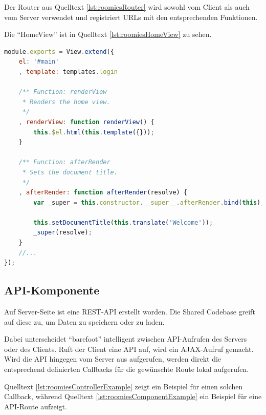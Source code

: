 Der Router aus Quelltext \ref{lst:roomiesRouter} wird sowohl vom Client als auch vom Server verwendet und registriert URLs mit den entsprechenden Funktionen.

Die ``HomeView'' ist in Quelltext \ref{lst:roomiesHomeView} zu sehen.

\begin{lstlisting}[language=JavaScript, caption=Ausschnitt aus HomeView der Beispielapplikation \cite{roomiesHomeView}, label=lst:roomiesHomeView, firstnumber=7]
module.exports = View.extend({
	el: '#main'
	, template: templates.login

	/** Function: renderView
	 * Renders the home view.
	 */
	, renderView: function renderView() {
		this.$el.html(this.template({}));
	}

	/** Function: afterRender
	 * Sets the document title.
	 */
	, afterRender: function afterRender(resolve) {
		var _super = this.constructor.__super__.afterRender.bind(this);

		this.setDocumentTitle(this.translate('Welcome'));
		_super(resolve);
	}
	//...
});
\end{lstlisting}

\subsection*{API-Komponente}
Auf Server-Seite ist eine REST-API \cite{REST} erstellt worden. Die Shared Codebase greift auf diese zu, um Daten zu speichern oder zu laden.

Dabei unterscheidet ``barefoot'' intelligent zwischen API-Aufrufen des Servers oder des Clients.
Ruft der Client eine API auf, wird ein AJAX-Aufruf gemacht. Wird die API
hingegen vom Server aus aufgerufen, werden direkt die entsprechend definierten
Callbacks für die gewünschte Route lokal aufgerufen.

Quelltext \ref{lst:roomiesControllerExample} zeigt ein Beispiel für einen solchen
Callback, während Quelltext \ref{lst:roomiesComponentExample} ein Beispiel für
eine API-Route aufzeigt.

